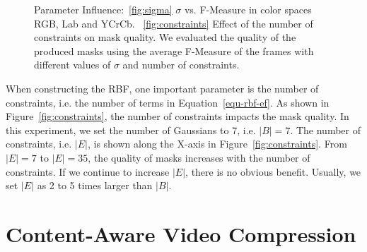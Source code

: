 \begin{figure}
	\centering
	\caption{Parameter Influence:~\ref{fig:sigma} $\sigma$ vs. F-Measure in color spaces RGB, Lab and YCrCb. ~\ref{fig:constraints} Effect of the number of constraints on mask quality. We evaluated the quality of the produced masks using the average F-Measure of the frames with different values of $\sigma$ and number of constraints.} 
	\label{fig-params}
\end{figure}

When constructing the RBF, one important parameter is the number of constraints, i.e. the number of terms in Equation~\ref{equ-rbf-ef}.
As shown in Figure~\ref{fig:constraints}, the number of constraints impacts the mask quality. In this experiment, we set the number of Gaussians to 7, i.e. $|B|=7$. The number of constraints, i.e. $|E|$, is shown along the X-axis in
Figure~\ref{fig:constraints}.
From $|E|=7$ to $|E|=35$, the quality of masks increases with the number of constraints. If we continue to increase $|E|$, there is no obvious benefit. Usually, we set $|E|$ as 2 to 5 times larger than $|B|$.

\section{Content-Aware Video Compression}
\label{sec:vos:cavc}

